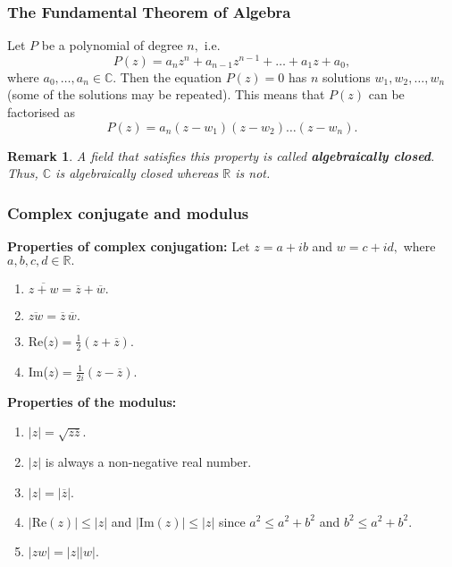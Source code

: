 \documentclass[12pt, a4paper]{article}
\newtheorem*{remark}{Remark}
\theoremstyle{definition}
\theoremstyle{plain}
\newcommand{\bb}[1]{\mathbb{#1}}
\newcommand{\conj}[1]{\overline{#1}}
\begin{document}
\subsubsection{The Fundamental Theorem of Algebra}

Let $P$ be a polynomial of degree $n,$ i.e. $$P(z) = a_n z^n + a_{n-1} z^{n-1} + \ldots +a_1 z+ a_0,$$ where $a_0,\ldots,a_n \in \bb{C}.$ Then the equation $P(z) = 0$ has $n$ solutions $w_1,w_2,\ldots,w_n$ (some of the solutions may be repeated). This means that $P(z)$ can be factorised as $$P(z) = a_n(z-w_1)(z-w_2)\ldots(z-w_n).$$

\begin{remark}
A field that satisfies this property is called \textbf{algebraically closed}. Thus, $\bb{C}$ is algebraically closed whereas $\bb{R}$ is not.
\end{remark}

\subsubsection{Complex conjugate and modulus}

\textbf{Properties of complex conjugation:}
Let $z=a+ib$ and $w=c+id,$ where $a,b,c,d \in \bb{R}.$

\begin{enumerate}
	
	\item $\conj{z+w} = \conj{z}+\conj{w}.$

	\item $\conj{zw} = \conj{z} \, \conj{w}.$

	\item Re($z)= \frac{1}{2}(z+\conj{z}).$

	\item Im($z)= \frac{1}{2i}(z-\conj{z}).$ 

\end{enumerate}

\textbf{Properties of the modulus:}

\begin{enumerate}
	
	\item $|z| = \sqrt{z\conj{z}}.$

	\item $|z|$ is always a non-negative real number.

	\item $|z|=|\conj{z}|.$

	\item $|\text{Re}(z)|\leq|z|$ and $|\text{Im}(z)|\leq|z|$ since $a^2\leq a^2+b^2$ and $b^2\leq a^2+b^2.$

	\item $|zw| = |z||w|.$

\end{enumerate}
\end{document}

